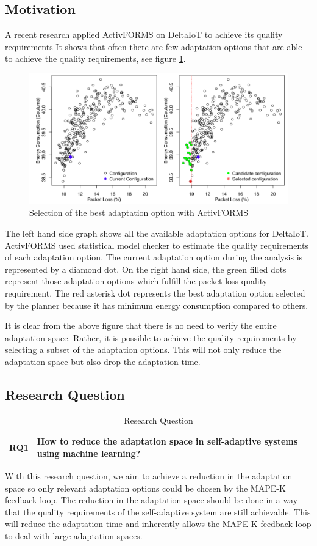 \documentclass[a4paper,12pt]{article}
\begin{document}
\subsection{Motivation}
A recent research applied ActivFORMS on DeltaIoT to achieve its quality requirements 
It shows that often there are few adaptation options that are able to achieve the quality requirements, see figure \ref{DeltaIoT-ActivFORMS}. 
\begin{figure}[H]
	\centering
	\includegraphics[keepaspectratio, width=\linewidth]{graphs/DeltaIoT-ActivFORMS.png}
	\caption{Selection of the best adaptation option with ActivFORMS %
	}
	\label{DeltaIoT-ActivFORMS}
\end{figure}
The left hand side graph shows all the available adaptation options for DeltaIoT. ActivFORMS used statistical model checker to estimate the quality requirements of each adaptation option. The current adaptation option during the analysis is represented by a diamond dot. On the right hand side, the green filled dots represent those adaptation options which fulfill the packet loss quality requirement. The red asterisk dot represents the best adaptation option selected by the planner because it has minimum energy consumption compared to others.

It is clear from the above figure that there is no need to verify the entire adaptation space. Rather, it is possible to achieve the quality requirements by selecting a subset of the adaptation options. This will not only reduce the adaptation space but also drop the adaptation time.
\subsection{Research Question}
\begin{table}[H]
	\centering
	\begin{tabular}{|p{1cm}|p{11cm}|}
		\hline
		\textbf{RQ1} & How to reduce the adaptation space in self-adaptive systems using machine learning? \\
		\hline
	\end{tabular}
	\caption{Research Question}
\end{table}
With this research question, we aim to achieve a reduction in the adaptation space so only relevant adaptation options could be chosen by the MAPE-K feedback loop. The reduction in the adaptation space should be done in a way that the quality requirements of the self-adaptive system are still achievable. This will reduce the adaptation time and inherently allows the MAPE-K feedback loop to deal with large adaptation spaces.
\end{document}
